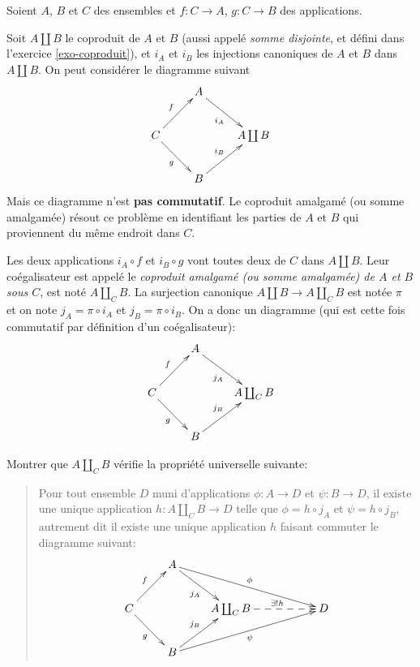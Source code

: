 \begin{exercice}
Soient $A$,  $B$ et $C$  des ensembles et $f :  C\to A$, $g : C\to B$ des applications.

Soit $A\coprod B$ le coproduit de $A$ et $B$ (aussi appelé \emph{somme disjointe}, et défini dans l'exercice \ref{exo-coproduit}), et $i_A$ et $i_B$ les injections canoniques de $A$ et $B$ dans $A\coprod B$. On peut considérer le diagramme suivant
\[ 
\xymatrix{
&A \ar[dr]_{i_A} &   \\
C\ar[ur]^f\ar[dr]_g& &  A\coprod B    \\
& B \ar[ur]^{i_B} & 
}\]
Mais ce diagramme n'est \textbf{pas commutatif}. Le coproduit amalgamé (ou somme amalgamée) résout ce problème en \og identifiant les parties de $A$ et $B$ qui proviennent du même endroit dans $C$\fg{}.


Les deux applications $i_A \circ f$ et $i_B \circ g$ vont toutes deux de $C$ dans $A\coprod B$.  Leur coégalisateur est appelé le \emph{coproduit amalgamé (ou somme amalgamée) de $A$ et $B$  sous $C$}, est noté $A\coprod_C B$. La surjection canonique  $A\coprod B \to A\coprod_C B$ est notée $\pi$ et on note $j_A = \pi \circ i_A$ et $j_B = \pi \circ i_B$. On a donc un diagramme (qui est cette fois commutatif par définition d'un coégalisateur):
\[ 
\xymatrix{
&A \ar[dr]_{j_A} &   \\
C\ar[ur]^f\ar[dr]_g& &  A\coprod_C B    \\
& B \ar[ur]^{j_B} & 
}\]

Montrer que $A\coprod_C B$ vérifie la propriété universelle suivante:
\begin{quote}
Pour tout ensemble  $D$ muni d'applications $\phi : A\to D$ et $\psi : B\to D$, il existe une unique application $h : A\coprod_C B \to D$ telle que $\phi = h\circ j_A$ et $\psi = h\circ j_B$, autrement dit il existe une unique application $h$ faisant commuter le diagramme  suivant:
\[ 
\xymatrix{
&A \ar[dr]_{j_A} \ar[drrr]^{\phi}& & & \\
C\ar[ur]^f\ar[dr]_g& &  A\coprod_C B \ar@{-->}[rr]^{\exists !h}  & & D\\
& B \ar[ur]^{j_B} \ar[urrr]_{\psi}& & &
}\]
\end{quote}
\end{exercice}

